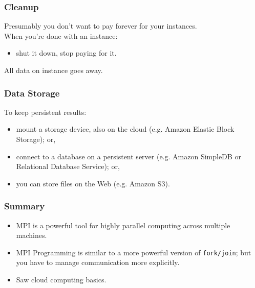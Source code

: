 \documentclass[aspectratio=43]{beamer}
\newenvironment{changemargin}[1]{%
  \begin{list}{}{%
    \setlength{\topsep}{0pt}%
    \setlength{\leftmargin}{#1}%
    \setlength{\rightmargin}{1em}
    \setlength{\listparindent}{\parindent}%
    \setlength{\itemindent}{\parindent}%
    \setlength{\parsep}{\parskip}%
  }%
  \item[]}{\end{list}}
\begin{document}
\begin{frame}
  \frametitle{Cleanup}

  \begin{changemargin}{1cm}
Presumably you don't want to pay forever for your instances.\\[1em]

When you're done with an instance:
\begin{itemize}
\item shut it down, stop paying for it.
\end{itemize}

All data on instance goes away.
  \end{changemargin}
\end{frame}


\begin{frame}
  \frametitle{Data Storage}
  \begin{changemargin}{2cm}
To keep persistent results:
\begin{itemize}
\item mount a storage device,
also on the cloud (e.g. Amazon Elastic Block Storage); or, 
\item connect to a database on a persistent server (e.g. Amazon SimpleDB or
Relational Database Service); or, 
\item you can store files on the Web (e.g. Amazon S3). 
\end{itemize}
  \end{changemargin}
\end{frame}


\begin{frame}
  \frametitle{Summary}

  \begin{changemargin}{1cm}

  \begin{itemize}
    \item MPI is a powerful tool for highly parallel computing across multiple
      machines.\\[1em]
    \item MPI Programming is similar to a more powerful version of {\tt fork/join}; 
but you have to manage communication more explicitly.\\[1em]
    \item Saw cloud computing basics.
  \end{itemize}
  \end{changemargin}
\end{frame}
\end{document}
